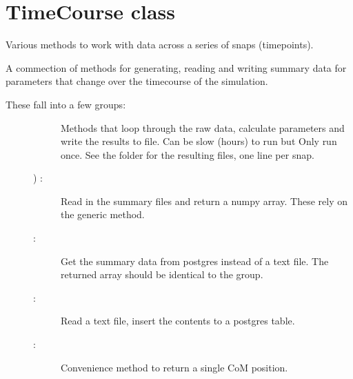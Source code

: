 \documentclass[letterpaper,10pt,english]{sphinxmanual}
\begin{document}
\chapter{TimeCourse class}
\label{\detokenize{timecourse:timecourse-class}}\label{\detokenize{timecourse::doc}}
Various methods to work with data across a series of snaps (timepoints).

\begin{fulllineitems}
\label{\detokenize{timecourse:galaxy.timecourse.TimeCourse}}
A commection of methods for generating, reading and writing summary data for 
parameters that change over the timecourse of the simulation.
\begin{description}
\item[{These fall into a few groups:}] \leavevmode\begin{description}
\item[{}] \leavevmode{[}{]}
Methods that loop through the raw data, calculate parameters and write 
the results to file. Can be slow (hours) to run but Only run once. 
See the  folder for the resulting files, one line per snap.

\item[{)\textasciigrave{} :}] \leavevmode
Read in the summary files and return a numpy array. These rely on the
generic  method.

\item[{ :}] \leavevmode
Get the summary data from postgres instead of a text file. 
The returned array should be identical to the  group.

\item[{ :}] \leavevmode
Read a text file, insert the contents to a postgres table.

\item[{ :}] \leavevmode
Convenience method to return a single CoM position.

\end{description}


\end{description}
\end{fulllineitems}
\end{document}
